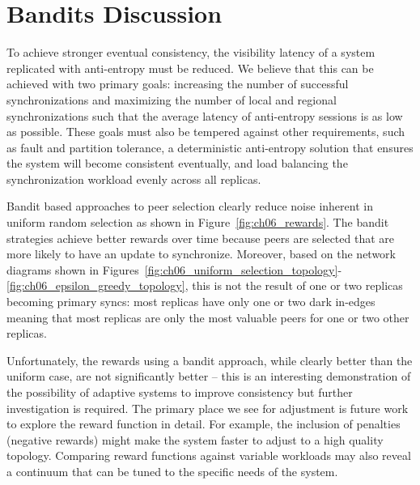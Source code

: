 \section{Bandits Discussion}
\label{ch06_bandits_discussion}

To achieve stronger eventual consistency, the visibility latency
of a system replicated with anti-entropy must be reduced.
We believe that this can be achieved with two primary goals: increasing
the number of successful synchronizations and maximizing the number
of local and regional synchronizations such that the average latency of
anti-entropy sessions is as low as possible.
These goals must also be tempered against other requirements, such as
fault and partition tolerance, a deterministic anti-entropy solution that
ensures the system will become consistent eventually, and load balancing
the synchronization workload evenly across all replicas.

Bandit based approaches to peer selection clearly reduce noise inherent
in uniform random selection as shown in Figure~\ref{fig:ch06_rewards}.
The bandit strategies achieve better rewards over time because peers
are selected that are more likely to have an update to synchronize.
Moreover, based on the network diagrams shown in
Figures~\ref{fig:ch06_uniform_selection_topology}-\ref{fig:ch06_epsilon_greedy_topology}, this is
not the result of one or two replicas becoming primary syncs: most
replicas have only one or two dark in-edges meaning that most replicas
are only the most valuable peers for one or two other replicas.

Unfortunately, the rewards using a bandit approach, while clearly better
than the uniform case, are not significantly better -- this is an interesting
demonstration of the possibility of adaptive systems to improve consistency
but further investigation is required.
The primary place we see for adjustment is future work to explore the reward
function in detail.
For example, the inclusion of penalties (negative rewards) might make
the system faster to adjust to a high quality topology.
Comparing reward functions against variable workloads may also reveal a
continuum that can be tuned to the specific needs of the system.


